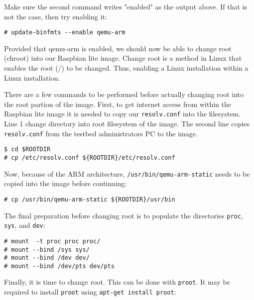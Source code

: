 Make sure the second command writes "enabled" as the output above. If that
is not the case, then try enabling it:

\begin{lstlisting}[]
# update-binfmts --enable qemu-arm
\end{lstlisting}
\FloatBarrier
\vspace{-5mm}

Provided that qemu-arm is enabled, we should now be able to change root (chroot)
into our Raspbian lite image. Change root is a method in Linux that enables
the root (/) to be changed. Thus, enabling a Linux installation within a
Linux installation.

There are a few commands to be performed before actually changing root into the
root partion of the image.
First, to get internet access from within the Raspbian lite image it is needed
to copy our \texttt{resolv.conf} into the filesystem. Line 1 change directory
into root filesystem of the image. The second line copies \texttt{resolv.conf}
from the testbed administrators \ac{PC} to the image.

\begin{lstlisting}[]
$ cd $ROOTDIR
# cp /etc/resolv.conf ${ROOTDIR}/etc/resolv.conf
\end{lstlisting}
\FloatBarrier
\vspace{-5mm}

Now, because of the \ac{ARM} architecture,
\texttt{/usr/bin/qemu-arm-static} needs to be copied into the image before continuing:

\begin{lstlisting}[]
# cp /usr/bin/qemu-arm-static ${ROOTDIR}/usr/bin
\end{lstlisting}
\FloatBarrier
\vspace{-5mm}

The final preparation before changing root is to populate the directories \texttt{proc},
\texttt{sys}, and \texttt{dev}:

\begin{lstlisting}[]
# mount  -t proc proc proc/
# mount --bind /sys sys/
# mount --bind /dev dev/
# mount --bind /dev/pts dev/pts
\end{lstlisting}
\FloatBarrier
\vspace{-5mm}

Finally, it is time to change root.
This can be done with \texttt{proot}. It may be required to install
\texttt{proot} using \texttt{apt-get install proot}:

